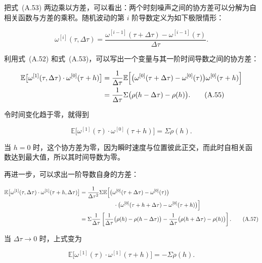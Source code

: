 把式~(A.53) 两边乘以方差，可以看出：两个时刻噪声之间的协方差可以分解为自相关函数与方差的乘积。随机波动的第 $i$ 阶导数定义为如下极限情形：

\begin{equation}
\omega^{[i]}(\tau,\Delta\tau)
=
\frac{\omega^{[i-1]}(\tau+\Delta\tau)-\omega^{[i-1]}(\tau)}{\Delta\tau}.
\tag{A.54}
\end{equation}

利用式~(A.52) 和式~(A.53)，可以写出一个变量与其一阶时间导数之间的协方差：

\begin{align}
\mathbb{E}\bigl[\omega^{[1]}(\tau,\Delta\tau)\cdot \omega^{[0]}(\tau+h)\bigr]
&=
\frac{1}{\Delta\tau}
\mathbb{E}\Bigl[
\bigl(\omega^{[0]}(\tau+\Delta\tau)-\omega^{[0]}(\tau)\bigr)\omega^{[0]}(\tau+h)
\Bigr]
\notag \\
&=
\frac{1}{\Delta\tau}\Sigma\bigl(\rho(h-\Delta\tau)-\rho(h)\bigr).
\tag{A.55}
\end{align}

令时间变化趋于零，就得到

\begin{equation}
\mathbb{E}\bigl[\omega^{[1]}(\tau)\cdot \omega^{[0]}(\tau+h)\bigr]
=
\Sigma \dot \rho(h).
\tag{A.56}
\end{equation}

当 $h=0$ 时，这个协方差为零，因为瞬时速度与位置彼此正交，而此时自相关函数达到最大值，所以其时间导数为零。

再进一步，可以求出一阶导数自身的方差：

\begin{align}
\mathbb{E}\bigl[\omega^{[1]}(\tau,\Delta\tau)\cdot \omega^{[1]}(\tau+h,\Delta\tau)\bigr]
&=
\frac{1}{\Delta\tau^2}\Sigma
\mathbb{E}\Bigl[
\bigl(\omega^{[0]}(\tau+\Delta\tau)-\omega^{[0]}(\tau)\bigr)
\notag \\
&\qquad\qquad\qquad\cdot
\bigl(\omega^{[0]}(\tau+h+\Delta\tau)-\omega^{[0]}(\tau+h)\bigr)
\Bigr]
\notag \\
&=
\Sigma\frac{1}{\Delta\tau}
\left[
\frac{1}{\Delta\tau}\bigl(\rho(h)-\rho(h-\Delta\tau)\bigr)
- \frac{1}{\Delta\tau}\bigl(\rho(h+\Delta\tau)-\rho(h)\bigr)
\right].
\tag{A.57}
\end{align}

当 $\Delta\tau \to 0$ 时，上式变为

\begin{equation}
\mathbb{E}\bigl[\omega^{[1]}(\tau)\cdot \omega^{[1]}(\tau+h)\bigr]
=
-\Sigma \ddot\rho(h).
\tag{A.58}
\end{equation}

